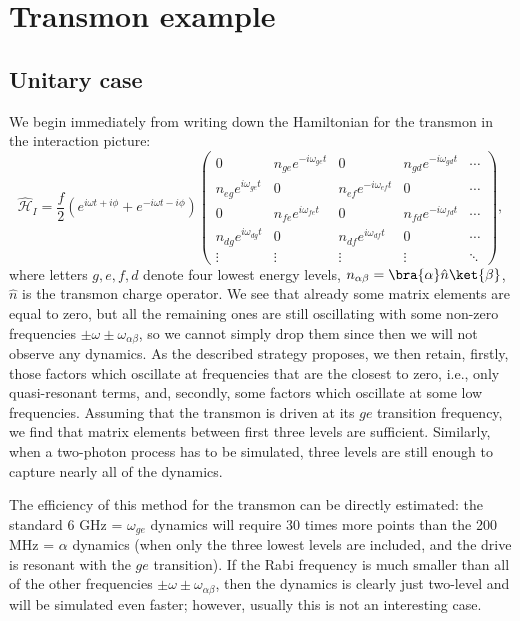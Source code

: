 \section{Transmon example}

\subsection{Unitary case}

We begin immediately from writing down the Hamiltonian for the transmon in the interaction picture:
\begin{equation*}
\hat{\mathcal H}_I =
\frac{f}{2}(e^{i\omega t +i\phi}+e^{-i\omega t - i\phi})
\left(
\begin{matrix}
0          & n_{ge}e^{-i\omega_{ge} t} & 0         & n_{gd}e^{-i\omega_{gd}t} & \cdots\\
             n_{eg}e^{i\omega_{ge}t} & 0          & n_{ef}e^{-i\omega_{ef}t} & 0         & \cdots\\
0          & n_{fe}e^{i\omega_{fe}t}  & 0         & n_{fd}e^{-i\omega_{fd}t} & \cdots\\
               n_{dg}e^{i\omega_{dg}t} & 0          & n_{df}e^{i\omega_{df}t} & 0         & \cdots\\
\vdots&\vdots&\vdots&\vdots& \ddots
\end{matrix}
\right),
\end{equation*}
where letters $g,e,f,d$ denote four lowest energy levels, $n_{\alpha\beta} = \bra{\alpha}\hat n \ket{\beta}$, $\hat n$ is the transmon charge operator. 
We see that already some matrix elements are equal to zero, but all the remaining ones are still oscillating with some non-zero frequencies $\pm \omega\pm\omega_{\alpha\beta}$, so we cannot simply drop them since then we will not observe any dynamics. As the described strategy proposes, we then retain, firstly, those factors which oscillate at frequencies that are the closest to zero, i.e., only quasi-resonant terms, and, secondly, some factors which oscillate at some low frequencies. Assuming that the transmon is driven at its $ge$ transition frequency, we find that matrix elements between first three levels are sufficient. Similarly, when a two-photon process has to be simulated, three levels are still enough to capture nearly all of the dynamics.

The efficiency of this method for the transmon can be directly estimated: the standard 6 GHz = $\omega_{ge}$ dynamics will require 30 times more points than the 200 MHz = $\alpha$ dynamics (when only the three lowest levels are included, and the drive is resonant with the $ge$ transition). If the Rabi frequency is much smaller than all of the other frequencies $\pm \omega\pm\omega_{\alpha\beta}$, then the dynamics is clearly just two-level and will be simulated even faster; however, usually this is not an interesting case.

